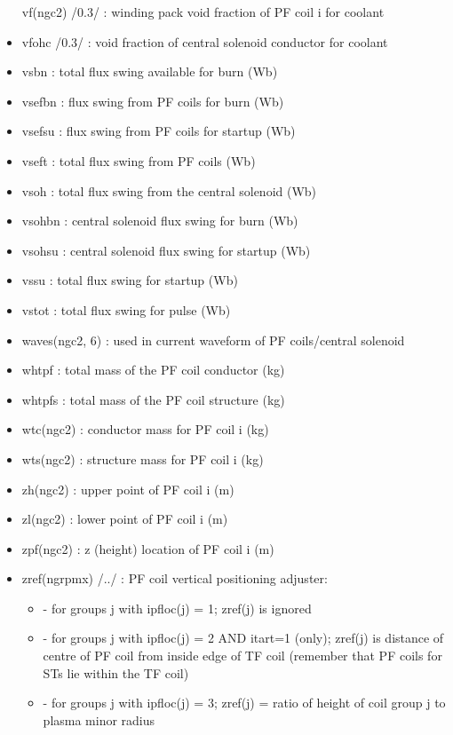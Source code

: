 \documentclass[]{article}
\providecommand{\tightlist}{%
  \setlength{\itemsep}{0pt}\setlength{\parskip}{0pt}}
\begin{document}
\begin{itemize}
  vf(ngc2) /0.3/ : winding pack void fraction of PF coil i for coolant
\item
  vfohc /0.3/ : void fraction of central solenoid conductor for coolant
\item
  vsbn : total flux swing available for burn (Wb)
\item
  vsefbn : flux swing from PF coils for burn (Wb)
\item
  vsefsu : flux swing from PF coils for startup (Wb)
\item
  vseft : total flux swing from PF coils (Wb)
\item
  vsoh : total flux swing from the central solenoid (Wb)
\item
  vsohbn : central solenoid flux swing for burn (Wb)
\item
  vsohsu : central solenoid flux swing for startup (Wb)
\item
  vssu : total flux swing for startup (Wb)
\item
  vstot : total flux swing for pulse (Wb)
\item
  waves(ngc2, 6) : used in current waveform of PF coils/central solenoid
\item
  whtpf : total mass of the PF coil conductor (kg)
\item
  whtpfs : total mass of the PF coil structure (kg)
\item
  wtc(ngc2) : conductor mass for PF coil i (kg)
\item
  wts(ngc2) : structure mass for PF coil i (kg)
\item
  zh(ngc2) : upper point of PF coil i (m)
\item
  zl(ngc2) : lower point of PF coil i (m)
\item
  zpf(ngc2) : z (height) location of PF coil i (m)
\item
  zref(ngrpmx) /../ : PF coil vertical positioning adjuster:

  \begin{itemize}
  \tightlist
  \item
    - for groups j with ipfloc(j) = 1; zref(j) is ignored
  \item
    - for groups j with ipfloc(j) = 2 AND itart=1 (only); zref(j) is
    distance of centre of PF coil from inside edge of TF coil (remember
    that PF coils for STs lie within the TF coil)
  \item
    - for groups j with ipfloc(j) = 3; zref(j) = ratio of height of coil
    group j to plasma minor radius
  \end{itemize}
\end{itemize}
\end{document}
